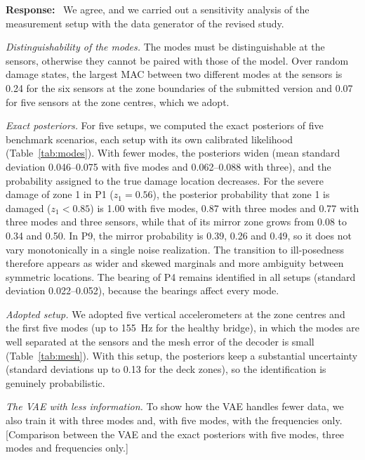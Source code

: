 \documentclass[11pt]{article}
\newenvironment{response}{\par\smallskip\noindent\color{resp}\textbf{Response:}\ }{\par}
\newcommand{\tbd}[1]{\textcolor{note}{\textsf{[#1]}}}
\begin{document}
\begin{response}
We agree, and we carried out a sensitivity analysis of the measurement setup with the data generator of the revised
study.

\textit{Distinguishability of the modes.} The modes must be distinguishable at the sensors, otherwise they cannot be
paired with those of the model. Over random damage states, the largest MAC between two different modes at the sensors is
0.24 for the six sensors at the zone boundaries of the submitted version and 0.07 for five sensors at the
zone centres, which we adopt.

\textit{Exact posteriors.} For five setups, we computed the exact posteriors of five benchmark scenarios, each setup with
its own calibrated likelihood (Table~\ref{tab:modes}). With fewer modes, the posteriors widen (mean standard deviation
0.046--0.075 with five modes and 0.062--0.088 with three), and the probability assigned to the true damage location
decreases. For the severe damage of zone 1 in P1 ($z_1=0.56$), the posterior probability that zone 1 is damaged ($z_1<0.85$) is 1.00 with five modes,
0.87 with three modes and 0.77 with three modes and three sensors, while that of its mirror zone grows from 0.08 to 0.34 and 0.50. In P9, the mirror
probability is 0.39, 0.26 and 0.49, so it does not vary monotonically in a single noise realization. The transition to ill-posedness therefore appears as wider and skewed marginals and more ambiguity between
symmetric locations. The bearing of P4 remains identified in all setups (standard deviation 0.022--0.052), because the bearings affect every mode.

\textit{Adopted setup.} We adopted five vertical accelerometers at the zone centres and the first five modes (up to
155~Hz for the healthy bridge), in which the modes are well separated at the sensors and the mesh error of the decoder is small
(Table~\ref{tab:mesh}). With this setup, the posteriors keep a substantial uncertainty (standard deviations up to 0.13 for the deck zones), so the
identification is genuinely probabilistic.

\textit{The VAE with less information.} To show how the VAE handles fewer data, we also train it with three modes and,
with five modes, with the frequencies only. 
\tbd{Comparison between the VAE and the exact posteriors with five modes, three modes and frequencies only.}
\end{response}
\end{document}
